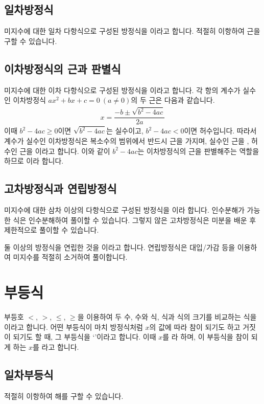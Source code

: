 \subsection{일차방정식}
미지수에 대한 일차 다항식으로 구성된 방정식을 이라고 합니다. 적절히 이항하여 근을 구할 수 있습니다.

\subsection{이차방정식의 근과 판별식}
미지수에 대한 이차 다항식으로 구성된 방정식을 이라고 합니다. 각 항의 계수가 실수인 이차방정식 $ax^2 + bx + c=0\: (a\ne 0)$의  두 근은 다음과 같습니다.
\begin{align*} x= \dfrac{-b\pm\sqrt{b^2-4ac}}{2a} \end{align*}
이때 $b^2 - 4ac \ge 0$이면 $\sqrt{b^2 - 4ac}$는 실수이고, $b^2 - 4ac < 0$이면 허수입니다. 따라서 계수가 실수인 이차방정식은 복소수의 범위에서 반드시 근을 가지며, 실수인 근을 , 허수인 근을 이라고 합니다. 이와 같이 $b^2 - 4ac$는 이차방정식의 근을 판별해주는 역할을 하므로 이라 합니다.

\subsection{고차방정식과 연립방정식}
미지수에 대한 삼차 이상의 다항식으로 구성된 방정식을 이라 합니다. 인수분해가 가능한 식은 인수분해하여 풀이할 수 있습니다. 그렇지 않은 고차방정식은 미분을 배운 후 제한적으로 풀이할 수 있습니다.

둘 이상의 방정식을 연립한 것을 이라고 합니다. 연립방정식은 대입/가감 등을 이용하여 미지수를 적절히 소거하여 풀이합니다.
\clearpage
\section{부등식}
부등호 $<$, $>$, $\le$, $\ge$을 이용하여 두 수, 수와 식, 식과 식의 크기를 비교하는 식을 이라고 합니다. 어떤 부등식이 마치 방정식처럼 $x$의 값에 따라 참이 되기도 하고 거짓이 되기도 할 때, 그 부등식을 `'이라고 합니다. 이때 $x$를 라 하며, 이 부등식을 참이 되게 하는 $x$를 라고 합니다.

\subsection{일차부등식}
적절히 이항하여 해를 구할 수 있습니다. 

